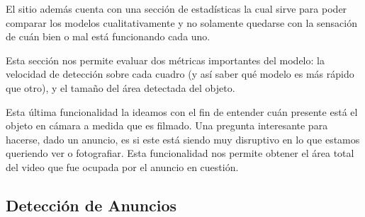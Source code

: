 \documentclass[a4paper]{article}
\begin{document}
El sitio además cuenta con una sección de estadísticas la cual sirve para poder comparar los modelos cualitativamente y no solamente quedarse con la sensación de cuán bien o mal está funcionando cada uno.

\begin{figure}[H]
\end{figure}

Esta sección nos permite evaluar dos métricas importantes del modelo: la velocidad de detección sobre cada cuadro (y así saber qué modelo es más rápido que otro), y el tamaño del área detectada del objeto.

Esta última funcionalidad la ideamos con el fin de entender cuán presente está el objeto en cámara a medida que es filmado. Una pregunta interesante para hacerse, dado un anuncio, es si este está siendo muy disruptivo en lo que estamos queriendo ver o fotografiar. Esta funcionalidad nos permite obtener el área total del video que fue ocupada por el anuncio en cuestión.

\subsection{Detección de Anuncios}
\end{document}
